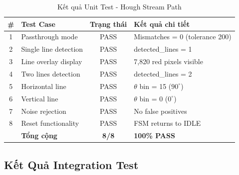 \documentclass[12pt,a4paper]{article}
\begin{document}
\begin{table}[H]
\centering
\caption{Kết quả Unit Test - Hough Stream Path}
\label{tab:unit_results}
\begin{tabular}{|c|l|c|l|}
\hline
\textbf{\#} & \textbf{Test Case} & \textbf{Trạng thái} & \textbf{Kết quả chi tiết} \\
\hline
1 & Passthrough mode & \cellcolor{passgreen!30}PASS & Mismatches = 0 (tolerance 200) \\
\hline
2 & Single line detection & \cellcolor{passgreen!30}PASS & detected\_lines = 1 \\
\hline
3 & Line overlay display & \cellcolor{passgreen!30}PASS & 7,820 red pixels visible \\
\hline
4 & Two lines detection & \cellcolor{passgreen!30}PASS & detected\_lines = 2 \\
\hline
5 & Horizontal line & \cellcolor{passgreen!30}PASS & $\theta$ bin = 15 ($90^\circ$) \\
\hline
6 & Vertical line & \cellcolor{passgreen!30}PASS & $\theta$ bin = 0 ($0^\circ$) \\
\hline
7 & Noise rejection & \cellcolor{passgreen!30}PASS & No false positives \\
\hline
8 & Reset functionality & \cellcolor{passgreen!30}PASS & FSM returns to IDLE \\
\hline
\hline
 & \textbf{Tổng cộng} & \textbf{8/8} & \textbf{100\% PASS} \\
\hline
\end{tabular}
\end{table}

\subsection{Kết Quả Integration Test}
\end{document}
